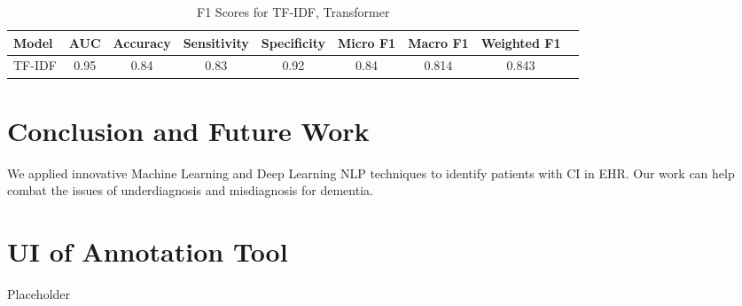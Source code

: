 \documentclass[pmlr,twocolumn,10pt]{jmlr} %
\begin{document}
\begin{table}[hbtp]
  {\begin{tabular}{lcccccccc}
    \toprule 
    \bfseries Model & \bfseries AUC & \bfseries Accuracy & \bfseries Sensitivity & \bfseries Specificity & \bfseries Micro F1  & \bfseries Macro F1 & \bfseries Weighted F1 \\ 
    \midrule
    TF-IDF & 0.95 & 0.84 & 0.83 & 0.92 & 0.84 & 0.814 & 0.843 \\
    \bottomrule
  \end{tabular}}
  {\caption{F1 Scores for TF-IDF, Transformer}}
\end{table}

\section{Conclusion and Future Work} 
\label{sec:ConclusionFutureWork} We applied innovative Machine Learning and Deep Learning NLP techniques to identify patients with CI in EHR. Our work can help combat the issues of underdiagnosis and misdiagnosis for dementia. %

\clearpage
\appendix

\section{UI of Annotation Tool}
Placeholder

\newpage

\end{document}
